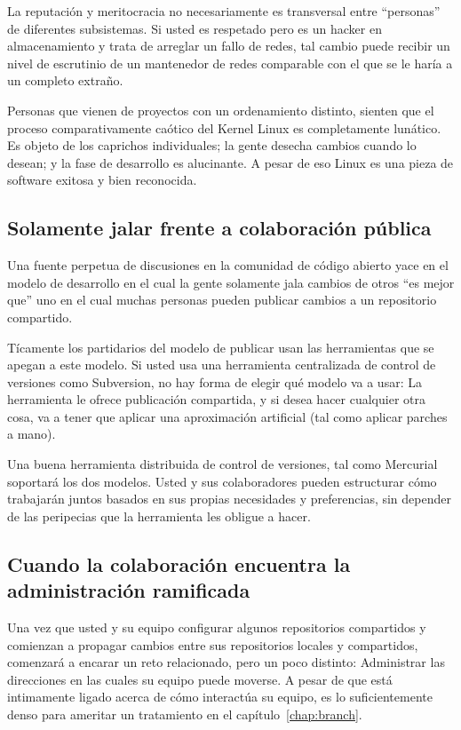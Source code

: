 La reputación y meritocracia no necesariamente es transversal entre
``personas'' de diferentes subsistemas.  Si usted es respetado pero es
un hacker en almacenamiento y trata de arreglar un fallo de redes,
tal cambio puede recibir un nivel de escrutinio de un mantenedor de
redes comparable con el que se le haría a un completo extraño.

Personas que vienen de proyectos con un ordenamiento distinto, sienten
que el proceso comparativamente caótico del Kernel Linux es
completamente lunático.  Es objeto de los caprichos individuales; la
gente desecha cambios cuando lo desean; y la fase de desarrollo es
alucinante. A pesar de eso Linux es una pieza de software exitosa y
bien reconocida.

\subsection{Solamente jalar frente a colaboración pública}

Una fuente perpetua de discusiones en la comunidad de código abierto
yace en el modelo de desarrollo en el cual la gente solamente jala
cambios de otros ``es mejor que'' uno  en el cual muchas personas
pueden publicar cambios a un repositorio compartido.

Tícamente los partidarios del modelo de publicar usan las herramientas
que se apegan a este modelo.  Si usted usa una herramienta
centralizada de control de versiones como Subversion, no hay forma de
elegir qué modelo va a usar: La herramienta le ofrece publicación
compartida, y si desea hacer cualquier otra cosa, va a tener que
aplicar una aproximación artificial (tal como aplicar parches a mano).

Una buena herramienta distribuida de control de versiones, tal como
Mercurial soportará los dos modelos.   Usted y sus colaboradores
pueden estructurar cómo trabajarán juntos basados en sus propias
necesidades y preferencias,  sin depender de las peripecias que la
herramienta les obligue a hacer.

\subsection{Cuando la colaboración encuentra la administración ramificada}

Una vez que usted y su equipo configurar algunos repositorios
compartidos y comienzan a propagar cambios entre sus repositorios
locales y compartidos, comenzará a encarar un reto relacionado, pero
un poco distinto:  Administrar las direcciones en las cuales su equipo
puede moverse.   A pesar de que está intimamente ligado acerca de cómo
interactúa su equipo, es lo suficientemente denso para ameritar un
tratamiento en el capítulo~\ref{chap:branch}.

